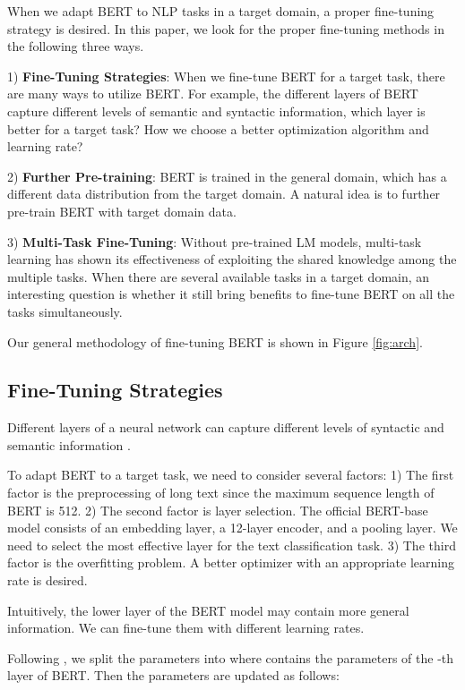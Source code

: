 \documentclass[11pt,a4paper]{article}
\theoremstyle{definition}
\begin{document}
\begin{CJK*}{UTF8}{gbsn}
When we adapt BERT to NLP tasks in a target domain, a proper fine-tuning strategy is desired. In this paper, we look for the proper fine-tuning methods in the following three ways.

1) \textbf{Fine-Tuning Strategies}: When we fine-tune BERT for a target task, there are many ways to utilize BERT. For example, the different layers of BERT capture different levels of semantic and syntactic information, which layer is better for a target task? How we choose a better optimization algorithm and learning rate?

2) \textbf{Further Pre-training}: BERT is trained in the general domain, which has a different data distribution from the target domain. A natural idea is to further pre-train BERT with target domain data.

3) \textbf{Multi-Task Fine-Tuning}: Without pre-trained LM models, multi-task learning has shown its effectiveness of exploiting the shared knowledge among the multiple tasks. When there are several available tasks in a target domain, an interesting question is whether it still bring benefits to fine-tune BERT on all the tasks simultaneously.

Our general methodology of fine-tuning BERT is shown in Figure \ref{fig:arch}.

\subsection{Fine-Tuning Strategies}

Different layers of a neural network can capture different levels of syntactic and semantic information \cite{yosinski2014transferable,howard2018universal}.

To adapt BERT to a target task, we need to consider several factors: 1) The first factor is the preprocessing of long text since the maximum sequence length of BERT is 512. 2) The second factor is layer selection. The official BERT-base model consists of an embedding layer, a 12-layer encoder, and a pooling layer. We need to select the most effective layer for the text classification task. 3) The third factor is the overfitting problem. A better optimizer with an appropriate learning rate is desired.

Intuitively, the lower layer of the BERT model may contain more general information. We can fine-tune them with different learning rates.






Following \citet{howard2018universal}, we split the parameters  into  where  contains the parameters of the -th layer of BERT. Then the parameters are updated as follows:
	

\end{CJK*}
\end{document}
